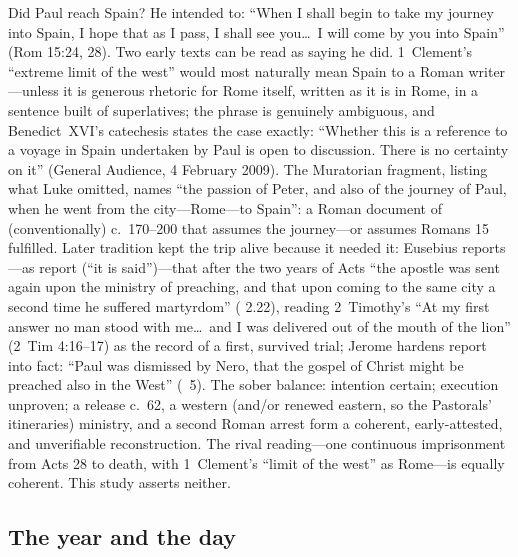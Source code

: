 Did Paul reach Spain? He intended to: ``When I shall begin to take my
journey into Spain, I hope that as I pass, I shall see you\ldots\ I will
come by you into Spain'' (Rom 15:24, 28). Two early texts can be read as
saying he did. 1~Clement's ``extreme limit of the west'' would most
naturally mean Spain to a Roman writer---unless it is generous rhetoric
for Rome itself, written as it is in Rome, in a sentence built of
superlatives; the phrase is genuinely ambiguous, and Benedict~XVI's
catechesis states the case exactly: ``Whether this is a reference to a
voyage in Spain undertaken by Paul is open to discussion. There is no
certainty on it'' (General Audience, 4 February 2009). The Muratorian
fragment, listing what Luke omitted, names ``the passion of Peter, and
also of the journey of Paul, when he went from the city---Rome---to
Spain'': a Roman document of (conventionally) c.~170--200 that assumes the
journey---or assumes Romans 15 fulfilled. Later tradition kept the trip
alive because it needed it: Eusebius reports---as report (``it is
said'')---that after the two years of Acts ``the apostle was sent again
upon the ministry of preaching, and that upon coming to the same city a
second time he suffered martyrdom'' ( 2.22), reading
2~Timothy's ``At my first answer no man stood with me\ldots\ and I was
delivered out of the mouth of the lion'' (2~Tim 4:16--17) as the record of
a first, survived trial; Jerome hardens report into fact: ``Paul was
dismissed by Nero, that the gospel of Christ might be preached also in the
West'' (~5). The sober balance: intention
certain; execution unproven; a release c.~62, a western (and/or renewed
eastern, so the Pastorals' itineraries) ministry, and a second Roman
arrest form a coherent, early-attested, and unverifiable reconstruction.
The rival reading---one continuous imprisonment from Acts 28 to death,
with 1~Clement's ``limit of the west'' as Rome---is equally coherent.
This study asserts neither.

\subsection{The year and the day}

